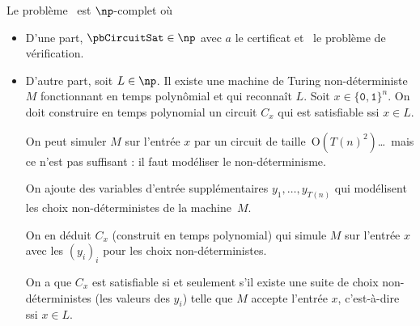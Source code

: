 \documentclass[./main]{subfiles}
\begin{document}
  \begin{thm}
    Le problème \pbCircuitSat\ est $\np$-complet où
    \showCircuitSat
  \end{thm}
  \begin{prv}
    \begin{itemize}
      \item D'une part, $\pbCircuitSat \in \np$ avec $a$ le certificat et \pbValCirc\ le problème de vérification.
      \item D'autre part, soit $L \in \np$.
        Il existe une machine de Turing non-déterministe $M$ fonctionnant en temps polynômial et qui reconnaît $L$.
        Soit $x \in \{\texttt{0}, \texttt{1}\}^n$. On doit construire en temps polynomial un circuit $C_x$ qui est satisfiable ssi $x \in L$.

        On peut simuler $M$ sur l'entrée $x$ par un circuit de taille~$\mathrm{O}(T(n)^2)$\ldots\ mais ce n'est pas suffisant : il faut modéliser le non-déterminisme.

        On ajoute des variables d'entrée supplémentaires $y_1, \ldots, y_{T(n)}$ qui modélisent les choix non-déterministes de la machine~$M$.

        On en déduit $C_x$ (construit en temps polynomial) qui simule $M$ sur l'entrée $x$ avec les $(y_i)_i$ pour les choix non-déterministes.

        On a que $C_x$ est satisfiable si et seulement s'il existe une suite de choix non-déterministes (les valeurs des $y_i$) telle que $M$ accepte l'entrée $x$, c'est-à-dire ssi $x \in L$.
    \end{itemize}
  \end{prv}
\end{document}
